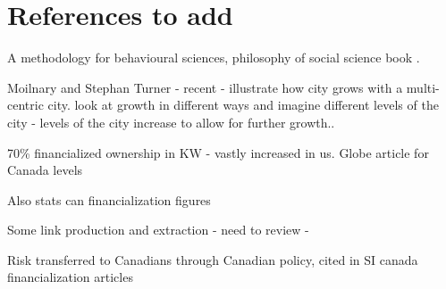 
\section{References to add}
A methodology for behavioural sciences, philosophy of social science book \cite{kaplanConductInquiryMethodology2017}.


Moilnary and Stephan Turner - recent - illustrate how city grows with a multi-centric city. look at growth in different ways and imagine different levels of the city - levels of the city increase to allow for further growth..

70\% financialized ownership in KW - vastly increased in us. Globe article for Canada levels

Also stats can financialization figures

Some link production and extraction - need to review -

Risk transferred to Canadians through Canadian policy, cited in SI canada financialization articles










